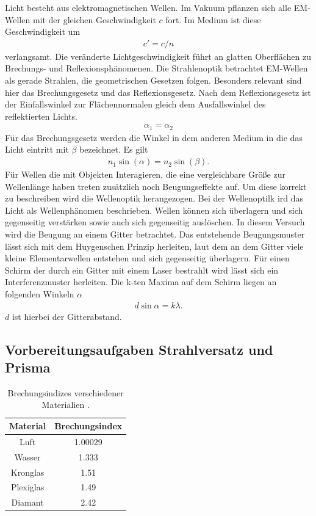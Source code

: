 Licht besteht aus elektromagnetischen Wellen.
Im Vakuum pflanzen sich alle EM-Wellen mit der gleichen Geschwindigkeit $c$ fort.
Im Medium ist diese Geschwindigkeit um 
\begin{align}
c'=c/n 
\label{eq:c_n}
\end{align}
verlangsamt.
Die veränderte Lichtgeschwindigkeit führt an glatten Oberflächen zu Brechungs- und Reflexionsphänomenen.
Die Strahlenoptik betrachtet EM-Wellen als gerade Strahlen, die geometrischen Gesetzen folgen.
Besonders relevant sind hier das Brechungsgesetz und das Reflexionsgesetz.
Nach dem Reflexionsgesetz ist der Einfallswinkel zur Flächennormalen gleich dem Ausfallswinkel des reflektierten Lichts.
\begin{align}
    \alpha_1 =\alpha_2
    \label{eq:reflexion}
\end{align}
Für das Brechungsgesetz werden die Winkel in dem anderen Medium in die das Licht eintritt mit $\beta$ bezeichnet.
Es gilt 
\begin{align}
    n_1 \sin(\alpha) = n_2 \sin(\beta).
    \label{eq:brechung}
\end{align}
Für Wellen die mit Objekten Interagieren, die eine vergleichbare Größe zur Wellenlänge haben 
treten zusätzlich noch Beugungseffekte auf.
Um diese korrekt zu beschreiben wird die Wellenoptik herangezogen.
Bei der Wellenoptilk ird das Licht als Wellenphänomen beschrieben.
Wellen können sich überlagern und sich gegenseitig verstärken sowie auch sich gegenseitig auslöschen.
In diesem Versuch wird die Beugung an einem Gitter betrachtet.
Das entstehende Beugungsmuster lässt sich mit dem Huygenschen Prinzip herleiten,
laut dem an dem Gitter viele kleine Elementarwellen entstehen und sich gegenseitig überlagern.
Für einen Schirm der durch ein Gitter mit einem Laser bestrahlt wird lässt sich ein Interferenzmuster herleiten.
Die k-ten Maxima auf dem Schirm liegen an folgenden Winkeln $\alpha$
\begin{align}
    d \sin{\alpha} = k \lambda.
    \label{eq:beugung}
\end{align}
$d$ ist hierbei der Gitterabstand.

\subsection{Vorbereitungsaufgaben Strahlversatz und Prisma}

\begin{table}
    \centering
    \begin{tabular}{c S }
        \toprule
        Material & {Brechungsindex}\\
        \midrule
        Luft        & 1.00029   \\
        Wasser      & 1.333     \\
        Kronglas    & 1.51      \\
        Plexiglas   & 1.49      \\
        Diamant     & 2.42      \\           
    \end{tabular}
    \caption{Brechungsindizes verschiedener Materialien \cite{brechungsindex}.}
    \label{tab:brechungsindex}
\end{table}

